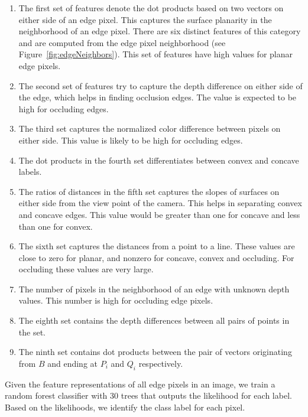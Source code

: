 \begin{enumerate}

\item The first set of features denote the dot products based on two vectors on either side of an 
edge pixel. This captures the surface planarity in the neighborhood of an edge pixel. There are six distinct features of this category and are computed from the edge pixel neighborhood (see Figure~\ref{fig:edgeNeighbors}). 
This set of features have high values for planar edge pixels.

\item The second set of features try to capture the depth difference on either side of the edge, 
which helps in finding occlusion edges. The value is expected to be high for occluding edges.

\item The third set captures the normalized color difference between pixels on either side. This 
value is likely to be high for occluding edges.

\item The dot products in the fourth set differentiates between convex and concave labels. 

\item The ratios of distances in the fifth set captures the slopes of surfaces on 
either side from the view point of the camera. This helps in separating convex and concave edges. 
This value would be greater than one for concave and less than one for convex.

\item The sixth set captures the distances from a point to a line. These values are close to zero for planar, 
and nonzero for concave, convex and occluding. For occluding these values are very large.

\item The number of pixels in the neighborhood of an edge with unknown depth values. This number 
is high for occluding edge pixels.

\item The eighth set contains the depth differences between all pairs of points in the set. 

\item The ninth set contains dot products between the pair of vectors originating from $B$ and ending at 
$P_i$ and $Q_i$ respectively.

\end{enumerate}

Given the feature representations of all edge pixels in an image, we train a random forest classifier
with 30 trees that outputs the likelihood for each label. Based on the likelihoods, we identify the class 
label for each pixel.  

